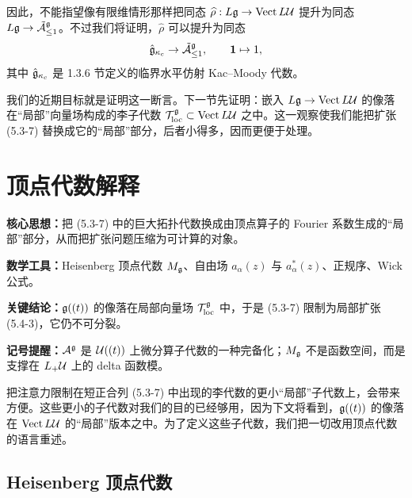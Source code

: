 
因此，不能指望像有限维情形那样把同态 $\widehat{\rho}: L\mathfrak{g} \to \operatorname{Vect} L\mathcal{U}$ 提升为同态 $L\mathfrak{g} \to \tilde{\mathcal{A}}^{\mathfrak{g}}_{\le1}$。不过我们将证明，$\widehat{\rho}$ 可以提升为同态
\[
\hat{\mathfrak{g}}_{\kappa_c} \to \tilde{\mathcal{A}}^{\mathfrak{g}}_{\le1}, \qquad \mathbf{1}\mapsto 1,
\]
其中 $\hat{\mathfrak{g}}_{\kappa_c}$ 是 1.3.6 节定义的临界水平仿射 Kac--Moody 代数。

我们的近期目标就是证明这一断言。下一节先证明：嵌入 $L\mathfrak{g} \to \operatorname{Vect} L\mathcal{U}$ 的像落在“局部”向量场构成的李子代数 $\mathcal{T}^{\mathfrak{g}}_{\mathrm{loc}} \subset \operatorname{Vect} L\mathcal{U}$ 之中。这一观察使我们能把扩张 (5.3-7) 替换成它的“局部”部分，后者小得多，因而更便于处理。

\section{顶点代数解释}

\begin{keypoints}
    \item \textbf{核心思想：}把 (5.3-7) 中的巨大拓扑代数换成由顶点算子的 Fourier 系数生成的“局部”部分，从而把扩张问题压缩为可计算的对象。
    \item \textbf{数学工具：}Heisenberg 顶点代数 $M_{\mathfrak{g}}$、自由场 $a_\alpha(z)$ 与 $a^*_\alpha(z)$、正规序、Wick 公式。
    \item \textbf{关键结论：}$\mathfrak{g}((t))$ 的像落在局部向量场 $\mathcal{T}^{\mathfrak{g}}_{\mathrm{loc}}$ 中，于是 (5.3-7) 限制为局部扩张 (5.4-3)，它仍不可分裂。
    \item \textbf{记号提醒：}$\mathcal{A}^{\mathfrak{g}}$ 是 $\mathcal{U}((t))$ 上微分算子代数的一种完备化；$M_{\mathfrak{g}}$ 不是函数空间，而是支撑在 $L_+\mathcal{U}$ 上的 delta 函数模。
\end{keypoints}

把注意力限制在短正合列 (5.3-7) 中出现的李代数的更小“局部”子代数上，会带来方便。这些更小的子代数对我们的目的已经够用，因为下文将看到，$\mathfrak{g}((t))$ 的像落在 $\operatorname{Vect} L\mathcal{U}$ 的“局部”版本之中。为了定义这些子代数，我们把一切改用顶点代数的语言重述。

\subsection{Heisenberg 顶点代数}

